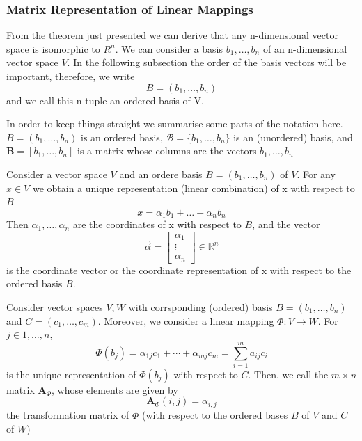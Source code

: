 \subsubsection{Matrix Representation of Linear Mappings}
From the theorem just presented we can derive that any n-dimensional vector space is isomorphic to $R^n$. We can consider a basis ${b_1,\ldots,b_n}$ of an n-dimensional vector space $V$. In the following subsection the order of the basis vectors will be important, therefore, we write
\[
    B = (b_1,\ldots,b_n)
\]
and we call this n-tuple an ordered basis of V.
\begin{remark}[Notation]
    In order to keep things straight we summarise some parts of the notation here. $B = (b_1,\ldots,b_n)$ is an ordered basis, $\mathcal{B} = \{b_1,\ldots,b_n\}$ is an (unordered) basis, and $\mathbf{B} = [b_1,\ldots,b_n]$ is a matrix whose columns are the vectors $b_1,\ldots, b_n$
\end{remark}
\begin{definition}[Coordinates]
    Consider a vector space $V$ and an ordere basis $B = (b_1,\ldots,b_n)$ of $V$. For any $x \in V$ we obtain a unique representation (linear combination) of x with respect to $B$
    \[
        x = \alpha_1b_1+\ldots+\alpha_nb_n  
    \]
    Then $\alpha_1,\ldots,\alpha_n$ are the coordinates of x with respect to $B$, and the vector
    \[
        \vec{\alpha} =
        \begin{bmatrix}
            \alpha_1\\
            \vdots\\
            \alpha_n
        \end{bmatrix} \in \mathbb{R}^n
    \]
    is the coordinate vector or the coordinate representation of x with respect to the ordered basis $B$.
\end{definition}
\begin{definition}
    Consider vector spaces $V,W$ with corrsponding (ordered) basis $B = (b_1,\ldots,b_n)$ and $C = (c_1,\ldots,c_m)$. Moreover, we consider a linear mapping $\Phi : V \longrightarrow W$. For $j \in {1,\ldots,n}$,
    \[
        \Phi(b_j) = \alpha_{1j}c_1+ \cdots + \alpha_{mj}c_m = \sum_{i=1}^{m}{a_{ij}c_i}  
    \]
    is the unique representation of $\Phi(b_j)$ with respect to $C$. Then, we call the $m\times n$ matrix $\mathbf{A}_{\Phi}$, whose elements are given by
        \[
            \mathbf{A}_{\Phi}(i,j) = \alpha_{i,j}
        \]
    the transformation matrix of $\Phi$ (with respect to the ordered bases $B$ of $V$ and $C$ of $W$)
\end{definition}
